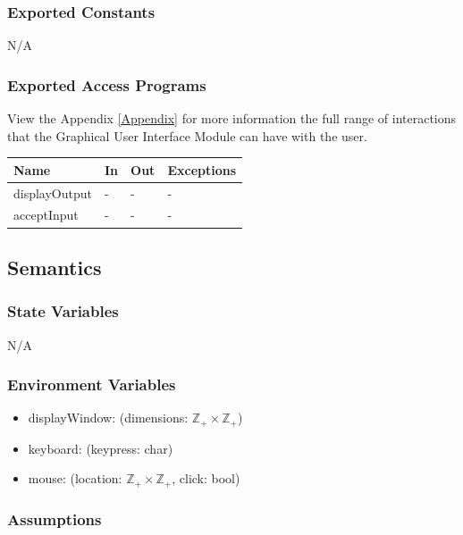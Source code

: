 \documentclass[12pt, titlepage]{article}
\begin{document}
\subsubsection{Exported Constants}

N/A

\subsubsection{Exported Access Programs}


View the Appendix \ref{Appendix} for more information the full range of
interactions that the Graphical User Interface Module can have with the user.

\begin{center}
\begin{tabular}{p{4cm} p{4cm} p{4cm} p{2cm}}
\hline
\textbf{Name} & \textbf{In} & \textbf{Out} & \textbf{Exceptions} \\
\hline
displayOutput & - & - & - \\
acceptInput & - & - & - \\
\hline
\end{tabular}
\end{center}

\subsection{Semantics}

\subsubsection{State Variables}

N/A

\subsubsection{Environment Variables}

\begin{itemize}
  \item displayWindow: (dimensions: $\mathbb{Z}_+ \times \mathbb{Z}_+$)
  \item keyboard: (keypress: char)
  \item mouse: (location: $\mathbb{Z}_+ \times \mathbb{Z}_+$, click: bool)
\end{itemize}

\subsubsection{Assumptions}
\end{document}
